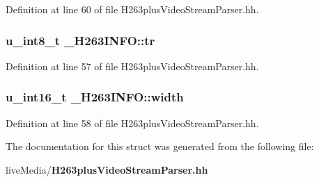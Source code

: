 Definition at line 60 of file H263plus\+Video\+Stream\+Parser.\+hh.

\subsubsection[{tr}]{\setlength{\rightskip}{0pt plus 5cm}u\+\_\+int8\+\_\+t \+\_\+\+H263\+I\+N\+F\+O\+::tr}\label{struct__H263INFO_abeb31af1d0cb9f8896134467ffeb28c1}


Definition at line 57 of file H263plus\+Video\+Stream\+Parser.\+hh.

\subsubsection[{width}]{\setlength{\rightskip}{0pt plus 5cm}u\+\_\+int16\+\_\+t \+\_\+\+H263\+I\+N\+F\+O\+::width}\label{struct__H263INFO_a29fde440de7650b7dec324a7718385e7}


Definition at line 58 of file H263plus\+Video\+Stream\+Parser.\+hh.



The documentation for this struct was generated from the following file\+:\begin{DoxyCompactItemize}
\item 
live\+Media/{\bf H263plus\+Video\+Stream\+Parser.\+hh}\end{DoxyCompactItemize}
